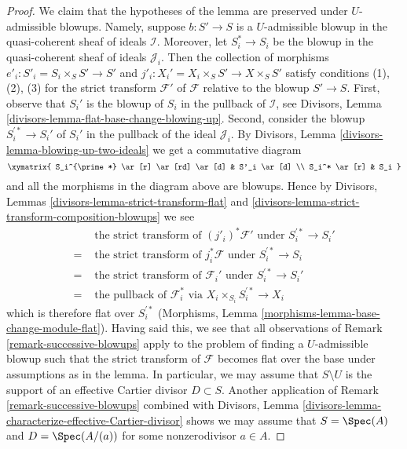 \begin{proof}
We claim that the hypotheses of the lemma are preserved under $U$-admissible
blowups. Namely, suppose $b : S' \to S$ is a $U$-admissible blowup in
the quasi-coherent sheaf of ideals $\mathcal{I}$. Moreover, let $S^*_i \to S_i$
be the blowup in the quasi-coherent sheaf of ideals $\mathcal{J}_i$.
Then the collection of morphisms $e'_i : S'_i = S_i \times_S S' \to S'$
and $j'_i : X_i' = X_i \times_S S' \to X \times_S S'$ satisfy conditions
(1), (2), (3) for the strict transform $\mathcal{F}'$ of $\mathcal{F}$
relative to the blowup $S' \to S$. First, observe that $S_i'$ is the
blowup of $S_i$ in the pullback of $\mathcal{I}$, see
Divisors, Lemma \ref{divisors-lemma-flat-base-change-blowing-up}.
Second, consider the blowup
$S_i^{\prime *} \to S_i'$ of $S_i'$ in the pullback of the ideal
$\mathcal{J}_i$.
By Divisors, Lemma \ref{divisors-lemma-blowing-up-two-ideals}
we get a commutative diagram
$$
\xymatrix{
S_i^{\prime *} \ar[r] \ar[rd] \ar[d] & S'_i \ar[d] \\
S_i^* \ar[r] & S_i
}
$$
and all the morphisms in the diagram above are blowups. Hence by
Divisors, Lemmas \ref{divisors-lemma-strict-transform-flat} and
\ref{divisors-lemma-strict-transform-composition-blowups}
we see
\begin{align*}
& \text{ the strict transform of }(j'_i)^*\mathcal{F}'\text{ under }
S_i^{\prime *} \to S_i' \\
= &
\text{ the strict transform of }j_i^*\mathcal{F}\text{ under }
S_i^{\prime *} \to S_i \\
= &
\text{ the strict transform of }\mathcal{F}_i'\text{ under }
S_i^{\prime *} \to S_i' \\
= &
\text{ the pullback of }\mathcal{F}_i^*\text{ via }
X_i \times_{S_i} S_i^{\prime *} \to X_i
\end{align*}
which is therefore flat over $S_i^{\prime *}$
(Morphisms, Lemma \ref{morphisms-lemma-base-change-module-flat}).
Having said this, we see that all observations of
Remark \ref{remark-successive-blowups} apply to the
problem of finding a $U$-admissible blowup such that the
strict transform of $\mathcal{F}$ becomes flat over the base
under assumptions as in the lemma. In particular, we may assume
that $S \setminus U$ is the support of an effective Cartier divisor
$D \subset S$. Another application of Remark \ref{remark-successive-blowups}
combined with
Divisors, Lemma \ref{divisors-lemma-characterize-effective-Cartier-divisor}
shows we may assume that $S = \Spec(A)$ and $D = \Spec(A/(a))$
for some nonzerodivisor $a \in A$.


\end{proof}
